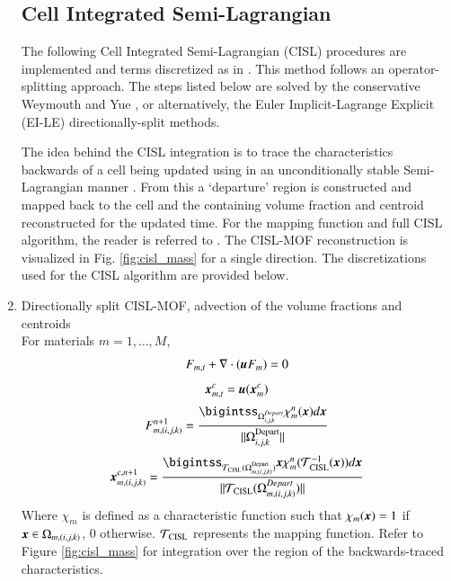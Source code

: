 \documentclass[preprint,12pt]{Definitions/elsarticle}
\newcommand{\tn}{\textnormal}
\newcommand{\bmu}{\mbox{\boldmath $u$\unboldmath}}
\newcommand{\bmx}{\mbox{\boldmath $x$\unboldmath}}
\begin{document}
\begin{enumerate}
	\subsection{Cell Integrated Semi-Lagrangian}\label{CISL}
	The following Cell Integrated Semi-Lagrangian (CISL) procedures are implemented and terms discretized as in \cite{pei2019hierarchical, LiETAL2015IncompressibleMultiphase,VAHAB2021}. This method follows an operator-splitting approach. The steps listed below are solved by the conservative  Weymouth and Yue \cite{WeymouthYue2010conservative}, or alternatively, the Euler Implicit-Lagrange Explicit (EI-LE) \cite{scardovelli2003interface,aulisa2007DirSplit} directionally-split methods. 
	
	The idea behind the CISL integration is to trace the characteristics backwards of a cell being updated using in an unconditionally stable Semi-Lagrangian manner \cite{STRAIN1999semiLagrangian, wang2012hybrid}. From this a `departure' region is constructed and mapped back to the cell and the containing volume fraction and centroid reconstructed for the updated time. For the mapping function and full CISL algorithm, the reader is referred to \cite{LiETAL2015IncompressibleMultiphase}. The CISL-MOF reconstruction is visualized in Fig. \ref{fig:cisl_mass} for a single direction. The discretizations used for the CISL algorithm are provided below.
	
	\item Directionally split CISL-MOF, advection of the volume fractions and centroids\\
	For materials $m=1, \ldots, M$,
	\begin{equation}
	F_{m,t}+\nabla\cdot(\bmu F_{m})=0
	\end{equation}
	\begin{equation}
	\bmx_{m,t}^c=\bmu(\bmx_{m}^c)
	\end{equation}
	\begin{equation}
	F_{m,(i,j,k)}^{n+1}=
	\frac{\bigintss_{\Omega_{i,j,k}^{Depart}} \chi_m^{n}(\bmx)d\bmx }
	{||\Omega_{i,j,k}^\tn{Depart}||} 		
	\end{equation}
	\begin{equation}
	\bmx_{m,(i,j,k)}^{c,n+1}=
	\frac{\bigintss_{\mathcal{T}_\tn{CISL}(\Omega_{m,(i,j,k)}^\tn{Depart})} 
		\bmx\chi_m^{n}(\mathcal{T}_\tn{CISL}^{-1}(\bmx)) d\bmx}
	{||\mathcal{T}_\tn{CISL}(\Omega_{m,(i,j,k)}^{Depart})||}
	\end{equation}
	Where $\displaystyle \chi_m$ is defined as a characteristic function such that $\chi_m(\bmx) = 1$ if $\bmx \in \Omega_{m,(i,j,k)}$, $0$ otherwise. $\mathcal{T}_\tn{CISL}$ represents the mapping function. Refer to Figure \ref{fig:cisl_mass} for integration over the region of the backwards-traced characteristics.
	

\end{enumerate}
\end{document}
